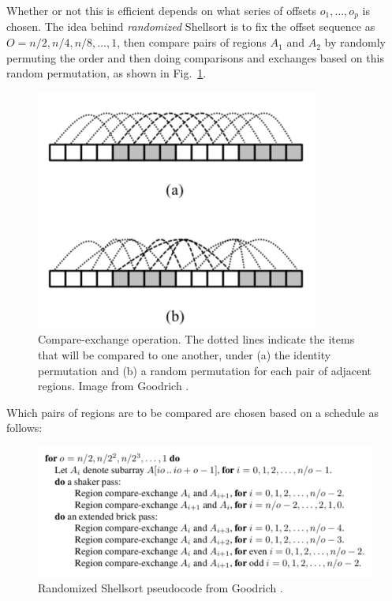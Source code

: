 \documentclass[11pt, oneside]{article}   	%
\begin{document}
Whether or not this is efficient depends on what series of offsets $o_1,\ldots, o_p$ is chosen. The idea behind \textit{randomized} Shellsort is to fix the offset sequence as $O = {n/2, n/4, n/8,\ldots,1}$, then compare pairs of regions $A_1$ and $A_2$ by randomly permuting the order and then doing comparisons and exchanges based on this random permutation, as shown in Fig.~\ref{fig:compare-exchange}. 

\begin{figure}
	\begin{center}
	\includegraphics{compare-exchange}
	\caption{Compare-exchange operation. The dotted lines indicate the items that will be compared to one another, under (a) the identity permutation and (b) a random permutation for each pair of adjacent regions. Image from Goodrich \cite{goodrich2010randomized}.}
	\label{fig:compare-exchange}
	\end{center}
\end{figure}

Which pairs of regions are to be compared are chosen based on a schedule as follows:

\begin{figure}[!h]
	\begin{center}
	\includegraphics[scale=0.7]{shellsort}
	\caption{Randomized Shellsort pseudocode from Goodrich \cite{goodrich2010randomized}.}
	\end{center}
\end{figure}
\end{document}
